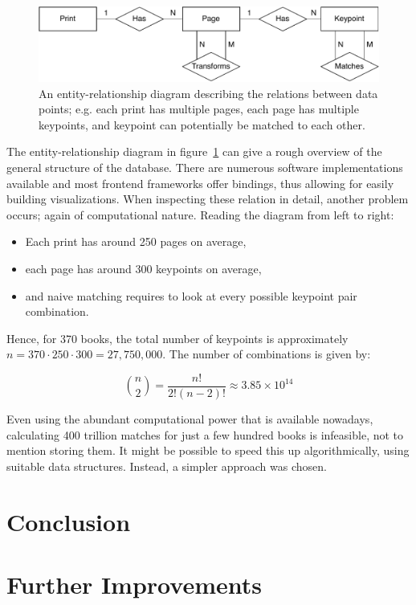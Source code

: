 \documentclass{ltjarticle}
\begin{document}
\begin{figure}
    \centering
    \includegraphics[width=\textwidth]{erschema.pdf}
    \caption[Entity-relationship diagram]{An entity-relationship diagram describing the relations between data points; e.g. each print has multiple pages, each page has multiple keypoints, and keypoint can potentially be matched to each other.}
    \label{fig:er-schema}
\end{figure}

The entity-relationship diagram in figure~\ref{fig:er-schema} can give a rough overview of the general structure of the database. There are numerous software implementations available and most frontend frameworks offer bindings, thus allowing for easily building visualizations. When inspecting these relation in detail, another problem occurs; again of computational nature. Reading the diagram from left to right:

\begin{itemize}
    \setlength\itemsep{0em}
    \item Each print has around 250 pages on average,
    \item each page has around 300 keypoints on average,
    \item and naive matching requires to look at every possible keypoint pair combination.
\end{itemize}

Hence, for 370 books, the total number of keypoints is approximately $n = 370 \cdot 250 \cdot 300 = 27,750,000$. The number of combinations is given by:

\begin{equation*}
    \binom{n}{2} = \frac{n!}{2!(n-2)!} \approx 3.85 \times 10^{14}
\end{equation*}

Even using the abundant computational power that is available nowadays, calculating 400 trillion matches for just a few hundred books is infeasible, not to mention storing them. It might be possible to speed this up algorithmically, using suitable data structures. Instead, a simpler approach was chosen.


\section{Conclusion}

\section{Further Improvements}

\printbibliography
\end{document}
